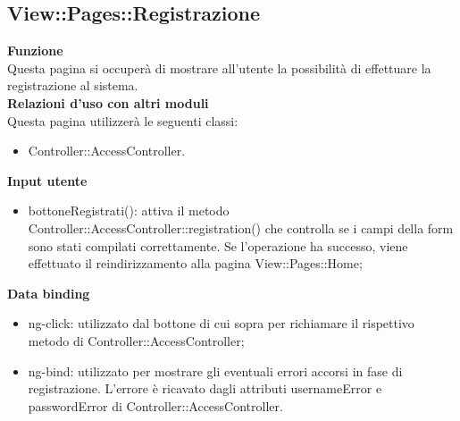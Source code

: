 {	\subsection{View::Pages::Registrazione}{
	\textbf{Funzione}\\
		\indent Questa pagina si occuperà di mostrare all'utente la possibilità di effettuare la registrazione al sistema.\\
	\textbf{Relazioni d'uso con altri moduli}\\
		\indent Questa pagina utilizzerà le seguenti classi:
	\begin{itemize}
		\item Controller::AccessController.
	\end{itemize}
	\textbf{Input utente}
		\begin{itemize}
		\item bottoneRegistrati(): attiva il metodo Controller::AccessController::registration() che controlla se i campi della form sono stati compilati correttamente. Se l'operazione ha successo, viene effettuato il reindirizzamento alla pagina View::Pages::Home;
	\end{itemize}
	\textbf{Data binding}
	\begin{itemize}
		\item ng-click: utilizzato dal bottone di cui sopra per richiamare il rispettivo metodo di Controller::AccessController;
		\item ng-bind: utilizzato per mostrare gli eventuali errori accorsi in fase di registrazione. L'errore è ricavato dagli attributi usernameError e passwordError di Controller::\-AccessController.
	\end{itemize}
	}
}

